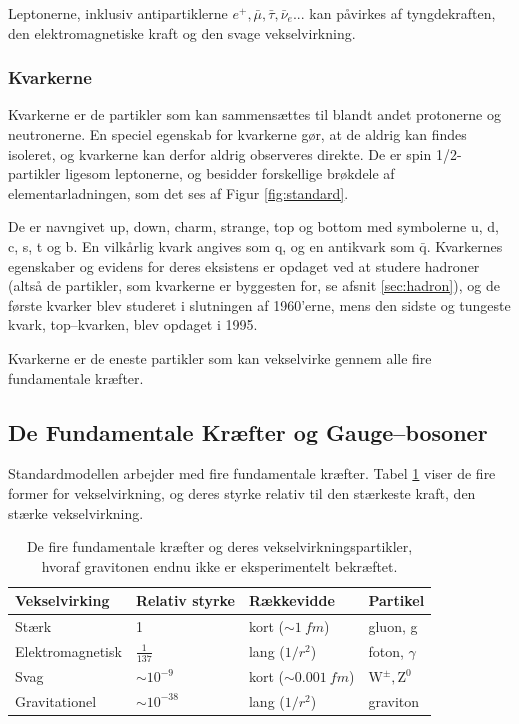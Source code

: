 Leptonerne, inklusiv antipartiklerne $e^+,\bar{\mu}, \bar{\tau},
\bar{\nu}_e...$ kan påvirkes af tyngdekraften, den elektromagnetiske
kraft og den svage vekselvirkning.

\subsubsection{Kvarkerne}
Kvarkerne er de partikler som kan sammensættes til blandt andet
protonerne og neutronerne. En speciel egenskab for kvarkerne gør, at
de aldrig kan findes isoleret, og kvarkerne kan derfor aldrig
observeres direkte. De er spin 1/2-partikler ligesom leptonerne, og
besidder forskellige brøkdele af elementarladningen, som det ses af
Figur \ref{fig:standard}.

De er navngivet up, down, charm, strange, top og bottom med symbolerne
u, d, c, s, t og b. En vilkårlig kvark angives som q, og en antikvark
som $\bar{\text{q}}$. Kvarkernes egenskaber og evidens for deres
eksistens er opdaget ved at studere hadroner (altså de partikler, som
kvarkerne er byggesten for, se afsnit \ref{sec:hadron}), og de første
kvarker blev studeret i slutningen af 1960'erne, mens den sidste og
tungeste kvark, top--kvarken, blev opdaget i 1995.

Kvarkerne er de eneste partikler som kan vekselvirke gennem alle fire
fundamentale kræfter.

\subsection{De Fundamentale Kræfter og Gauge--bosoner}
Standardmodellen arbejder med fire fundamentale kræfter. Tabel
\ref{tab:forces} viser de fire former for vekselvirkning, og deres
styrke relativ til den stærkeste kraft, den stærke vekselvirkning.

\begin{table}[h]
\centering
    \begin{tabular}{l|l|l|l}
    Vekselvirking    & Relativ styrke  & Rækkevidde                   & Partikel                   \\ \hline
    Stærk            & 1               & kort ($\sim \SI{1}{fm}$)     & gluon, g                   \\
    Elektromagnetisk & $\frac{1}{137}$ & lang ($1/r^2$)               & foton, $\gamma$            \\
    Svag             & $\sim 10^{-9}$  & kort  ($\sim \SI{0.001}{fm}$) & $\text{W}^\pm, \text{Z}^0$ \\
    Gravitationel    & $\sim 10^{-38}$ & lang ($1/r^2$)               & graviton                   \\
    \end{tabular}
    \caption{De fire fundamentale kræfter og deres
        vekselvirkningspartikler, hvoraf gravitonen endnu ikke er
        eksperimentelt bekræftet.}
    \label{tab:forces}
\end{table}

